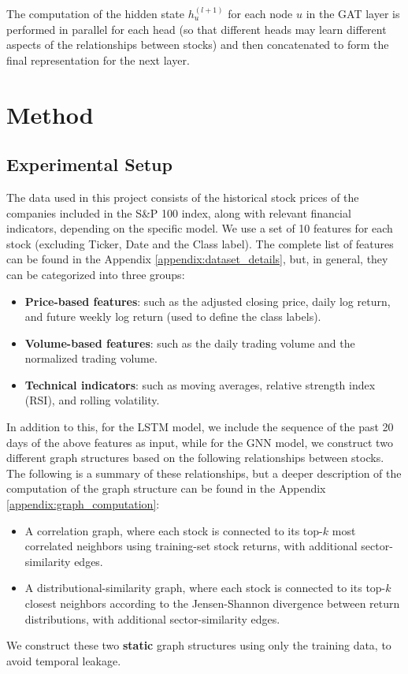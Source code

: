 \documentclass{article}
\begin{document}
The computation of the hidden state \(h_u^{(l+1)}\) for each node \(u\) in the GAT layer is performed in parallel for each head (so that different heads may learn different aspects of the relationships between stocks) and then concatenated to form the final representation for the next layer.

\section{Method}

\subsection{Experimental Setup}

The data used in this project consists of the historical stock prices of the companies included in the S\&P 100 index, along with relevant financial indicators, depending on the specific model. We use a set of 10 features for each stock (excluding Ticker, Date and the Class label). The complete list of features can be found in the Appendix \ref{appendix:dataset_details}, but, in general, they can be categorized into three groups:
\begin{itemize}
    \item \textbf{Price-based features}: such as the adjusted closing price, daily log return, and future weekly log return (used to define the class labels).
    \item \textbf{Volume-based features}: such as the daily trading volume and the normalized trading volume.
    \item \textbf{Technical indicators}: such as moving averages, relative strength index (RSI), and rolling volatility.
\end{itemize}

In addition to this, for the LSTM model, we include the sequence of the past 20 days of the above features as input, while for the GNN model, we construct two different graph structures based on the following relationships between stocks. The following is a summary of these relationships, but a deeper description of the computation of the graph structure can be found in the Appendix \ref{appendix:graph_computation}:
\begin{itemize}
    \item A correlation graph, where each stock is connected to its top-$k$ most correlated neighbors using training-set stock returns, with additional sector-similarity edges.
    \item A distributional-similarity graph, where each stock is connected to its top-$k$ closest neighbors according to the Jensen-Shannon divergence between return distributions, with additional sector-similarity edges.
\end{itemize}
We construct these two \textbf{static} graph structures using only the training data, to avoid temporal leakage.
\end{document}
